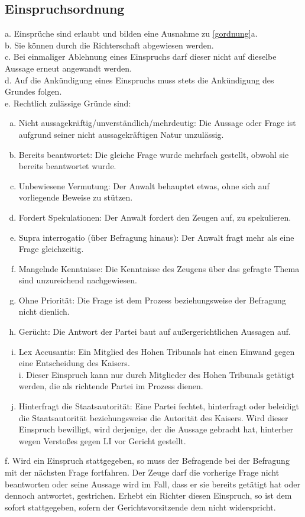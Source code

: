 \documentclass{article}
\begin{document}
\subsection{Einspruchsordnung}
\label{eordnung}
a. Einsprüche sind erlaubt und bilden eine Ausnahme zu \ref{gordnung}a.\\
b. Sie können durch die Richterschaft abgewiesen werden.\\
c. Bei einmaliger Ablehnung eines Einspruchs darf dieser nicht auf dieselbe Aussage erneut angewandt werden.\\
d. Auf die Ankündigung eines Einspruchs muss stets die Ankündigung des Grundes folgen.\\
e. Rechtlich zulässige Gründe sind:
\begin{enumerate}[a)]
\item Nicht aussagekräftig/unverständlich/mehrdeutig: Die Aussage oder Frage ist aufgrund seiner nicht aussagekräftigen Natur unzulässig.
\item Bereits beantwortet: Die gleiche Frage wurde mehrfach gestellt, obwohl sie bereits beantwortet wurde.
\item Unbewiesene Vermutung: Der Anwalt behauptet etwas, ohne sich auf vorliegende Beweise zu stützen.
\item Fordert Spekulationen: Der Anwalt fordert den Zeugen auf, zu spekulieren.
\item Supra interrogatio (über Befragung hinaus): Der Anwalt fragt mehr als eine Frage gleichzeitig.
\item Mangelnde Kenntnisse: Die Kenntnisse des Zeugens über das gefragte Thema sind unzureichend nachgewiesen.
\item Ohne Priorität: Die Frage ist dem Prozess beziehungsweise der Befragung nicht dienlich.
\item Gerücht: Die Antwort der Partei baut auf außergerichtlichen Aussagen auf.
\item Lex Accusantis: Ein Mitglied des Hohen Tribunals hat einen Einwand gegen eine Entscheidung des Kaisers.\\
i. Dieser Einspruch kann nur durch Mitglieder des Hohen Tribunals getätigt werden, die als richtende Partei im Prozess dienen.\\
\item Hinterfragt die Staatsautorität: Eine Partei fechtet, hinterfragt oder beleidigt die Staatsautorität beziehungsweise die Autorität des Kaisers. Wird dieser Einspruch bewilligt, wird derjenige, der die Aussage gebracht hat, hinterher wegen Verstoßes gegen LI vor Gericht gestellt.
\end{enumerate}
f. Wird ein Einspruch stattgegeben, so muss der Befragende bei der Befragung mit der nächsten Frage fortfahren. Der Zeuge darf die vorherige Frage nicht beantworten oder seine Aussage wird im Fall, dass er sie bereits getätigt hat oder dennoch antwortet, gestrichen. Erhebt ein Richter diesen Einspruch, so ist dem sofort stattgegeben, sofern der Gerichtsvorsitzende dem nicht widerspricht.
\end{document}
